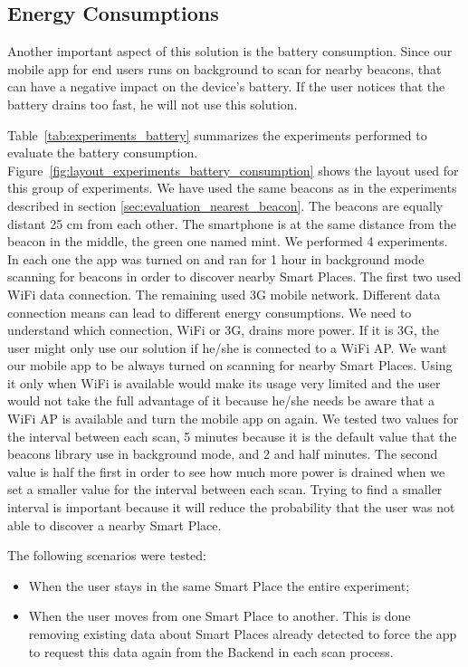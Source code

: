 \subsection{Energy Consumptions}
\label{sub:evaluation_energy_consumptions}
Another important aspect of this solution is the battery consumption.
Since our mobile app for end users runs on background to scan for nearby beacons, that can have a negative impact on the device's battery. If the user notices that the battery drains too fast, he will not use this solution.

Table~\ref{tab:experiments_battery} summarizes the experiments performed to evaluate the battery consumption.
Figure~\ref{fig:layout_experiments_battery_consumption} shows the layout used for this group of experiments.
We have used the same beacons as in the experiments described in section \ref{sec:evaluation_nearest_beacon}.
The beacons are equally distant 25 cm from each other.
The smartphone is at the same distance from the beacon in the middle, the green one named mint.
We performed 4 experiments.
In each one the app was turned on and ran for 1 hour in background mode scanning for beacons in order to discover nearby Smart Places.
The first two used \gls{WiFi} data connection.
The remaining used \gls{3G} mobile network.
Different data connection means can lead to different energy consumptions.
We need to understand which connection, \gls{WiFi} or \gls{3G}, drains more power.
If it is \gls{3G}, the user might only use our solution if he/she is connected to a \gls{WiFi} \gls{AP}.
We want our mobile app to be always turned on scanning for nearby Smart Places.
Using it only when \gls{WiFi} is available would make its usage very limited and the user would not take the full advantage of it because he/she needs be aware that a \gls{WiFi} \gls{AP} is available and turn the mobile app on again.
We tested two values for the interval between each scan, 5 minutes because it is the default value that the beacons library use in background mode, and 2 and half minutes.
The second value is half the first in order to see how much more power is drained when we set a smaller value for the interval between each scan.
Trying to find a smaller interval is important because it will reduce the probability that the user was not able to discover a nearby Smart Place.

The following scenarios were tested:
\begin{itemize}
  \item
  When the user stays in the same Smart Place the entire experiment;
  \item
  When the user moves from one Smart Place to another.
  This is done removing existing data about Smart Places already detected to force the app to request this data again from the Backend in each scan process.
\end{itemize}

